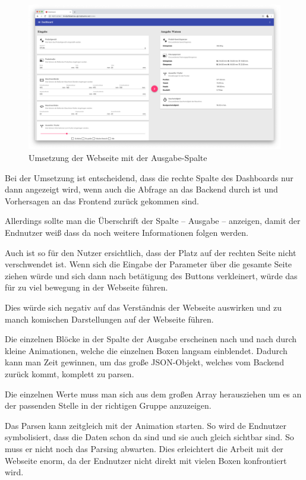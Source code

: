 \begin{figure}[h]
    \centering
    \includegraphics[width=\textwidth]{images/kapitel_4/website_output.png}
    \caption{Umsetzung der Webseite mit der Ausgabe-Spalte}
    \label{fig:umsetzung_website_output}
\end{figure}

Bei der Umsetzung ist entscheidend, dass die rechte Spalte des Dashboards nur dann angezeigt wird, wenn auch die Abfrage
an das Backend durch ist und Vorhersagen an das Frontend zurück gekommen sind.

Allerdings sollte man die Überschrift der Spalte -- Ausgabe -- anzeigen, damit der Endnutzer weiß dass da noch weitere
Informationen folgen werden.

Auch ist so für den Nutzer ersichtlich, dass der Platz auf der rechten Seite nicht verschwendet ist. Wenn sich die
Eingabe der Parameter über die gesamte Seite ziehen würde und sich dann nach betätigung des Buttons verkleinert, würde
das für zu viel bewegung in der Webseite führen.

Dies würde sich negativ auf das Verständnis der Webseite auswirken und zu manch komischen Darstellungen auf der Webseite
führen.

Die einzelnen Blöcke in der Spalte der Ausgabe erscheinen nach und nach durch kleine Animationen, welche die einzelnen
Boxen langsam einblendet. Dadurch kann man Zeit gewinnen, um das große JSON-Objekt, welches vom Backend zurück kommt,
komplett zu parsen.

Die einzelnen Werte muss man sich aus dem großen Array herausziehen um es an der passenden Stelle in der richtigen
Gruppe anzuzeigen.

Das Parsen kann zeitgleich mit der Animation starten. So wird de Endnutzer symbolisiert, dass die Daten schon da sind
und sie auch gleich sichtbar sind. So muss er nicht noch das Parsing abwarten. Dies erleichtert die Arbeit mit der
Webseite enorm, da der Endnutzer nicht direkt mit vielen Boxen konfrontiert wird.

